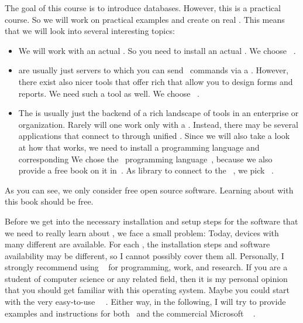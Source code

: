 %
%
%
The goal of this course is to introduce databases.
However, this is a practical course.
So we will work on practical examples and create   on real .
This means that we will look into several interesting topics:%
%
\begin{itemize}%
%
\item We will work with an actual . %
So you need to install an actual . %
We choose \postgresql~\cite{TA2024DDAMWPAM,FP2023LP,OH2017PUAR,B2024PELUYDW}.%
%
\item {} are usually just servers to which you can send \sql\ commands via a  . %
However, there exist also nicer tools that offer rich  that allow you to design forms and reports. %
We need such a tool as well. %
We choose \libreofficeBase~\cite{FNFHWSKLSSGLFRSRPLJG2022BG7R1BOL7C,S2022L7PFEUU}.%
%
\item The  is usually just the backend of a rich landscape of tools in an enterprise or organization. %
Rarely will one work only with a . %
Instead, there may be several applications that connect to  through unified . %
Since we will also take a look at how that works, we need to install a programming language and corresponding  %
We chose the \python\ programming language~\cite{K2018EIPFEUU,A2002PC,H2023ABGTP3P,LH2015DSAAWP}, because we also provide a free book on it in~\cite{programmingWithPython}. %
As library to connect to the \postgresql\ , we pick \psycopg~\cite{VDGE2010P}.%
%
\end{itemize}%
%
As you can see, we only consider free open source software.
Learning about  with this book should be free.

Before we get into the necessary installation and setup steps for the software that we need to really learn about , we face a small problem:
Today, devices with many different  are available.
For each , the installation steps and software availability may be different, so I cannot possibly cover them all.
Personally, I strongly recommend using \linux~\cite{T1999TLE,B2022ELATCL,H2022LML} for programming, work, and research.
If you are a student of computer science or any related field, then it is my personal opinion that you should get familiar with this operating system.
Maybe you could start with the very easy-to-use \ubuntu\ \linux~\cite{CN2020ULB,H2020ULU2E}.
Either way, in the following, I will try to provide examples and instructions for both \ubuntu\ and the commercial Microsoft \windows~\cite{B2023W1IO} .%
%
%
%
%
\endhsection%
%

